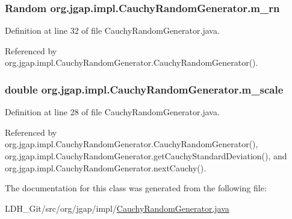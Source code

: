 \hypertarget{classorg_1_1jgap_1_1impl_1_1_cauchy_random_generator_a9897946e348321835339fa2a01f1ccae}{
\subsubsection[{m\-\_\-rn}]{\setlength{\rightskip}{0pt plus 5cm}Random org.\-jgap.\-impl.\-Cauchy\-Random\-Generator.\-m\-\_\-rn\hspace{0.3cm}{\ttfamily [private]}}}\label{classorg_1_1jgap_1_1impl_1_1_cauchy_random_generator_a9897946e348321835339fa2a01f1ccae}


Definition at line 32 of file Cauchy\-Random\-Generator.\-java.



Referenced by org.\-jgap.\-impl.\-Cauchy\-Random\-Generator.\-Cauchy\-Random\-Generator().

\hypertarget{classorg_1_1jgap_1_1impl_1_1_cauchy_random_generator_a6d9ef477f95ada68c829dc05938c1ca5}{
\subsubsection[{m\-\_\-scale}]{\setlength{\rightskip}{0pt plus 5cm}double org.\-jgap.\-impl.\-Cauchy\-Random\-Generator.\-m\-\_\-scale\hspace{0.3cm}{\ttfamily [private]}}}\label{classorg_1_1jgap_1_1impl_1_1_cauchy_random_generator_a6d9ef477f95ada68c829dc05938c1ca5}


Definition at line 28 of file Cauchy\-Random\-Generator.\-java.



Referenced by org.\-jgap.\-impl.\-Cauchy\-Random\-Generator.\-Cauchy\-Random\-Generator(), org.\-jgap.\-impl.\-Cauchy\-Random\-Generator.\-get\-Cauchy\-Standard\-Deviation(), and org.\-jgap.\-impl.\-Cauchy\-Random\-Generator.\-next\-Cauchy().



The documentation for this class was generated from the following file\-:\begin{DoxyCompactItemize}
\item 
L\-D\-H\-\_\-\-Git/src/org/jgap/impl/\hyperlink{_cauchy_random_generator_8java}{Cauchy\-Random\-Generator.\-java}\end{DoxyCompactItemize}
